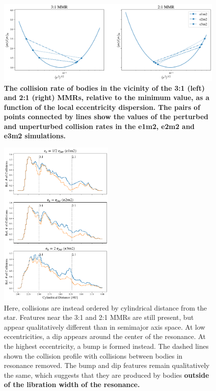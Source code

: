 \documentclass[fleqn,usenatbib]{mnras}
\begin{document}
\begin{figure}
\begin{center}
    \includegraphics[width=\textwidth]{figures/gf_plot.png}
    \caption{\textbf{The collision rate of bodies in the vicinity of the 3:1 (left) and 2:1 (right) MMRs, relative to the minimum value, as a function of the local eccentricity dispersion. The pairs of points connected by lines show the values of the perturbed and unperturbed collision rates in the e1m2, e2m2 and e3m2 simulations.}\label{fig:gf}}
\end{center}
\end{figure}

\begin{figure}
\begin{center}
    \includegraphics[width=0.5\textwidth]{figures/coll_hist_r.png}
    \caption{Here, collisions are instead ordered by cylindrical distance from the star. Features near the 3:1 and 2:1 MMRs are still present, but appear qualitatively different than in semimajor axis space. At low eccentricities, a dip appears around the center of the resonance. At the highest eccentricity, a bump is formed instead. The dashed lines shown the collision profile with collisions between bodies in resonance removed. The bump and dip features remain qualitatively the same, which suggests that they are produced by bodies \textbf{outside of the libration width of the resonance.}\label{fig:coll_hist_r}}
\end{center}
\end{figure}
\end{document}
